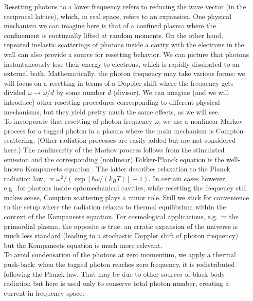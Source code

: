 \documentclass[a4paper,12pt,reqno,superscriptaddress,nofootinbib]{revtex4}
\theoremstyle{plain}
\theoremstyle{definition}
\theoremstyle{remark}
\newcommand{\0}{^{(0)}}
\newcommand{\1}{^{(1)}}
\newcommand{\2}{^{(2)}}
\begin{document}
Resetting photons to a lower frequency refers to reducing the wave vector (in the reciprocal lattice), which, in real space, refers to an expansion. One physical mechanism we can imagine here is that of a confined plasma where the confinement is continually lifted at random moments. On the other hand, repeated inelastic scatterings of photons inside a cavity with the electrons in the wall can also provide a source for resetting behavior. We can picture that photons instantaneously lose their energy to electrons, which is rapidly dissipated to an external bath. 
Mathematically, the photon frequency may take various forms: we will focus on a resetting in terms of a Doppler shift where the frequency gets divided $\omega \rightarrow \omega/d$ by some number $d$ (divisor).  We can imagine (and we will introduce) other resetting procedures corresponding to different physical mechanisms, but they yield pretty much the same effects, as we will see.\\
To incorporate that resetting of photon frequency  $\omega$, we use a nonlinear Markov process for a tagged photon in a plasma where the main mechanism is Compton scattering. (Other radiation processes are easily added but are not considered here.)  The nonlinearity of the Markov process follows from the stimulated emission and the corresponding (nonlinear) Fokker-Planck equation is the well-known Kompaneets equation \cite{kompa}.  The latter describes relaxation to the Planck radiation law, $\propto \omega^2 / (\exp[\hbar\omega/(k_BT)]-1)$.    In certain cases however, e.g.\ for photons inside optomechanical cavities, while resetting  the frequency still makes sense, Compton scattering plays a minor role.  Still we stick for convenience to the setup where the radiation relaxes to thermal equilibrium within the context of the Kompaneets equation. For cosmological applications, e.g.\ in the primordial plasma, the opposite is true: an erratic expansion of the universe is much less standard (leading to a stochastic Doppler shift of photon frequency) but the Kompaneets equation is much more relevant.\\

To avoid condensation of the photons at zero momentum, we apply a thermal push-back: when the tagged photon reaches zero frequency, it is redistributed following the Planck law. That may be due to other sources of black-body radiation but here is used only to conserve total photon number, creating a current in frequency space.\\
\end{document}
